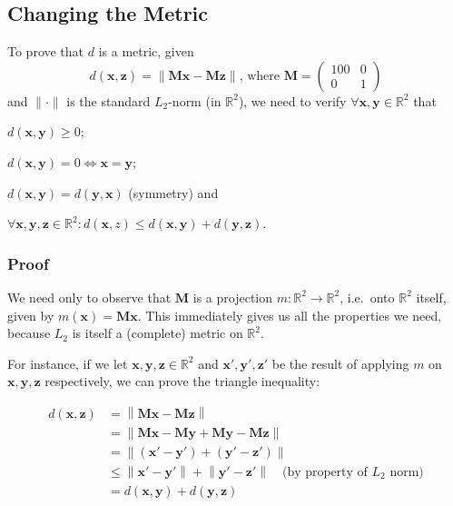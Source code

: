 \documentclass{article}
\newcommand{\vect}[1]{\ensuremath{\boldsymbol{\mathbf{#1}}}\xspace}
\begin{document}

\subsection{Changing the Metric}

To prove that $d$ is a metric, given
\[
d(\vect{x},\vect{z}) = \|\vect{M}\vect{x} - \vect{M}\vect{z}\|\text{,
  where } \vect{M} = \begin{pmatrix} 100 & 0 \\ 0 & 1\end{pmatrix}
\]
and $\|\cdot\|$ is the standard $L_2$-norm (in $\mathbb{R}^2$), we
need to verify $\forall \vect{x},\vect{y}\in \mathbb{R}^2$ that
\begin{inparaenum}[1)]
  \item $d(\vect{x},\vect{y}) \geq 0$; 
  \item $d(\vect{x},\vect{y}) = 0 \Leftrightarrow \vect{x} = \vect{y}$;
  \item $d(\vect{x},\vect{y}) =  d(\vect{y},\vect{x})$ (symmetry) and
  \item $\forall \vect{x},\vect{y},\vect{z} \in \mathbb{R}^2 : d(\vect{x},z) \leq d(\vect{x},\vect{y}) + d(\vect{y},\vect{z})$.
\end{inparaenum}

\subsubsection{Proof}

We need only to observe that $\vect{M}$ is a projection $m : \mathbb{R}^2 \rightarrow \mathbb{R}^2$, i.e.\ onto $\mathbb{R}^2$ itself, given by $m(\vect{x}) = \vect{M}\vect{x}$. This immediately gives us all the properties we need, because $L_2$ is itself a (complete) metric on $\mathbb{R}^2$.

For instance, if we let $\vect{x},\vect{y},\vect{z} \in \mathbb{R}^2$ and $\vect{x'},\vect{y'},\vect{z'}$ be the result of applying $m$ on $\vect{x},\vect{y},\vect{z}$ respectively, we can prove the triangle inequality:

\begin{align}
\nonumber d(\vect{x},\vect{z}) &= \left\|\vect{M}\vect{x} - \vect{M}\vect{z}\right\|\\
\nonumber &= \left\|\vect{M}\vect{x} - \vect{M}\vect{y} + \vect{M}\vect{y} - \vect{M}\vect{z}\right\|\\
\nonumber &= \left\|(\vect{x'} - \vect{y'}) + (\vect{y'} - \vect{z'})\right\|\\
\nonumber &\leq \left\|\vect{x'} - \vect{y'}\right\| + \left\|\vect{y'} - \vect{z'}\right\|\quad \text{(by property of } L_2 \text{ norm)}\\
  &= d(\vect{x},\vect{y}) + d(\vect{y},\vect{z})
\end{align}
\end{document}
